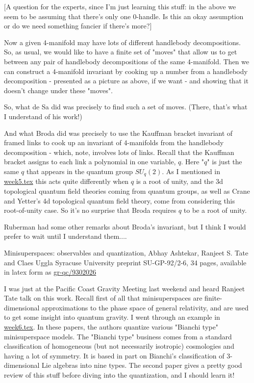 [A question for the experts, since I'm just learning this stuff: in the above we seem to be assuming that there's only one 0-handle. Is this an okay assumption or do we need something fancier if there's more?]

Now a given 4-manifold may have lots of different handlebody decompositions. So, as usual, we would like to have a finite set of "moves" that allow us to get between any pair of handlebody decompositions of the same 4-manifold. Then we can construct a 4-manifold invariant by cooking up a number from a handlebody decomposition - presented as a picture as above, if we want - and showing that it doesn't change under these "moves".

So, what de Sa did was precisely to find such a set of moves. (There, that's what I understand of his work!)

And what Broda did was precisely to use the Kauffman bracket invariant of framed links to cook up an invariant of 4-manifolds from the handlebody decomposition - which, note, involves lots of links. Recall that the Kauffman bracket assigns to each link a polynomial in one variable, $q$. Here "$q$" is just the same $q$ that appears in the quantum group $SU_q(2)$. As I mentioned in {\hyperref[week5]{week5.tex}} this acts quite differently when $q$ is a root of unity, and the 3d topological quantum field theories coming from quantum groups, as well as Crane and Yetter's 4d topological quantum field theory, come from considering this root-of-unity case. So it's no surprise that Broda requires $q$ to be a root of unity.

Ruberman had some other remarks about Broda's invariant, but I think I would prefer to wait until I understand them....


Minisuperspaces: observables and quantization, Abhay Ashtekar, Ranjeet S. Tate and Claes Uggla Syracuse University preprint SU-GP-92/2-6, 34 pages, available in latex form as \href{https://arxiv.org/abs/gr-qc/9302027}{gr-qc/9302026}

I was just at the Pacific Coast Gravity Meeting last weekend and heard Ranjeet Tate talk on this work. Recall first of all that minisuperspaces are finite-dimensional approximations to the phase space of general relativity, and are used to get some insight into quantum gravity. I went through an example in {\hyperref[week6]{week6.tex}}. In these papers, the authors quantize various "Bianchi type" minisuperspace models. The "Bianchi type" business comes from a standard classification of homogeneous (but not necessarily isotropic) cosmologies and having a lot of symmetry. It is based in part on Bianchi's classification of 3-dimensional Lie algebras into nine types. The second paper gives a pretty good review of this stuff before diving into the quantization, and I should learn it!

